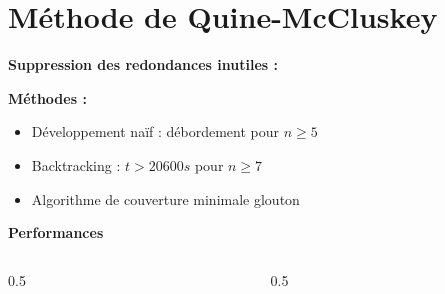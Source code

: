 \documentclass[handout]{beamer}
\begin{document}
\section{Méthode de Quine-McCluskey}
\begin{frame}
  
  \textbf{Suppression des redondances inutiles : }
   \vfill\null  
  \begin{tikzpicture}[scale=2]
  
  \end{tikzpicture}  
  \vfill\null  
  
  \par
  \textbf{Méthodes :}
  \begin{itemize}
  	\item Développement naïf : débordement pour $n\geq 5$
  	\item Backtracking : $t>20600s$ pour $n\geq 7$
  	\item Algorithme de couverture minimale glouton
  \end{itemize} 
  \vfill\null 
  
  \textbf{Performances}
  \par
  \begin{columns}
  	  \begin{column}[t]{0.5\hsize}
	  \begin{tikzpicture}[scale=0.8]
	  
	  \end{tikzpicture}
	  \end{column}
	  
	  \begin{column}[t]{0.5\hsize}
	  \begin{tikzpicture}[scale=0.8]
	  
	  \end{tikzpicture}
	  \end{column}
	\end{columns}
	  
%  
%    
%
%
\end{frame}
\end{document}

